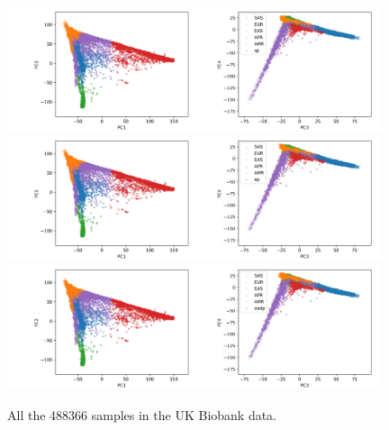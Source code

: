 \documentclass{article}
\begin{document}
\begin{figure}[p]
  \centering
  \includegraphics[width=0.98\textwidth]{img/ukb_snpscap_kgn_bial_orphans_nchunks100_sturef_kgn_bial_orphans_snps_ukb_snpscap_ukb_sp.png}
  \includegraphics[width=0.98\textwidth]{img/ukb_snpscap_kgn_bial_orphans_nchunks100_sturef_kgn_bial_orphans_snps_ukb_snpscap_ukb_ap.png}
  \includegraphics[width=0.98\textwidth]{img/ukb_snpscap_kgn_bial_orphans_nchunks100_sturef_kgn_bial_orphans_snps_ukb_snpscap_ukb_oadp.png}
  \caption{All the 488366 samples in the UK Biobank data.}
\end{figure}
\end{document}
